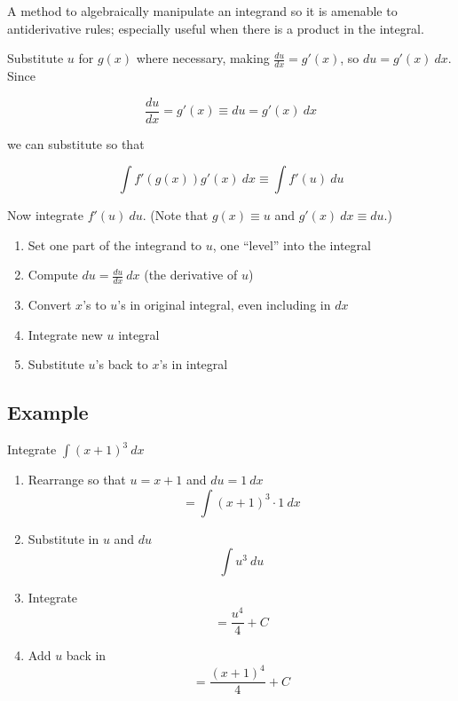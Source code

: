 
A method to algebraically manipulate an integrand so it is amenable to antiderivative rules; especially useful when there is a product in the integral.

Substitute $u$ for $g(x)$ where necessary, making $\frac{du}{dx} = g'(x)$, so $du = g'(x)~ dx$. Since

\begin{equation}
    \frac{du}{dx} = g'(x) \equiv du = g'(x)~ dx
\end{equation}

we can substitute so that

\begin{equation}
    \int f'(g(x)) g'(x)~ dx \equiv \int f'(u)~ du
\end{equation}

Now integrate $f'(u)~ du$. (Note that $g(x) \equiv u$ and $g'(x)~ dx \equiv du$.)

\begin{enumerate}
    \item Set one part of the integrand to $u$, one ``level'' into the integral
    \item Compute $du = \frac{du}{dx} ~dx$ (the derivative of $u$)
    \item Convert $x$'s to $u$'s in original integral, even including in $dx$
    \item Integrate new $u$ integral
    \item Substitute $u$'s back to $x$'s in integral
\end{enumerate}

\subsection*{Example}

Integrate $\int (x + 1)^3~ dx$

\begin{enumerate}
	\item Rearrange so that $u = x + 1$ and $du = 1~ dx$
		\begin{equation}
			= \int (x + 1)^3 \cdot 1 ~ dx
		\end{equation}
	\item Substitute in $u$ and $du$
		\begin{equation}
			\int u^3 ~ du
		\end{equation}
	\item Integrate
		\begin{equation}
			= \frac{u^4}{4} + C
		\end{equation}
	\item Add $u$ back in
		\begin{equation}
			= \frac{(x + 1)^4}{4} + C
		\end{equation}
\end{enumerate}

